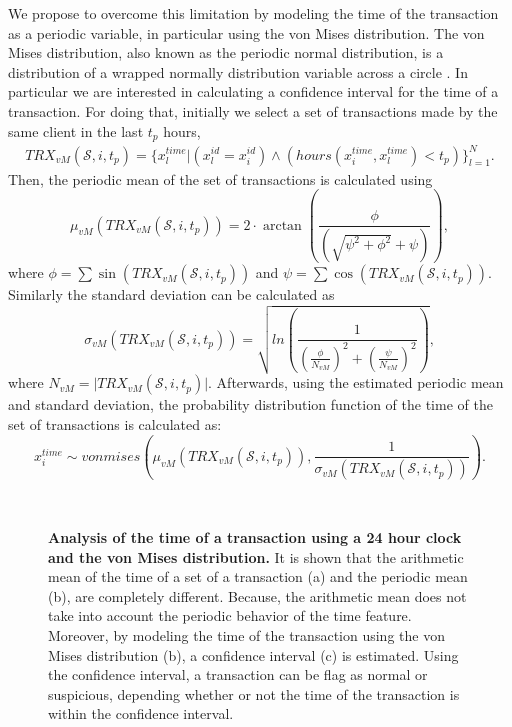 	We propose to overcome this limitation by modeling the time of the transaction as a periodic 
	variable, in particular using the von Mises distribution. The von Mises distribution, also known 
	as the periodic normal distribution, is a distribution of a wrapped normally distribution 
	variable across a circle \citep{Fisher1996}. In particular we are interested in calculating a 
	confidence interval 	for the time of a transaction. For doing that, initially we select a set of 
	transactions made by 	the same client in the last $t_p$ hours,
	\begin{align}\label{eq:pe_features1}
		TRX_{vM}(\mathcal{S},i, t_p) = \bigg\{ x_l^{time} \bigg\vert   
		\left(x_l^{id}=x_i^{id}\right)\wedge  \left(hours(x_i^{time},x_l^{time})< t_p\right) 
		\bigg\}_{l=1}^N.
	\end{align}
	Then, the periodic mean of the set 	of transactions is calculated using 
	\begin{equation}
		\mu_{vM}(TRX_{vM}(\mathcal{S},i, t_p)) = 2\cdot \arctan\left(\frac{\phi}{\left(
		\sqrt{\psi^2 + \phi^2} +	\psi \right)} \right),
	\end{equation}
	where $\phi=\sum \sin(TRX_{vM}(\mathcal{S},i, t_p))$ and $\psi=\sum \cos(TRX_{vM}(\mathcal{S},i, 
	t_p))$. Similarly the standard deviation can be calculated as
	\begin{equation}
		\sigma_{vM}(TRX_{vM}(\mathcal{S},i, t_p)) = \sqrt{ ln\left( \frac{1}{
		\left(\frac{\phi}{N_{vM}} \right)^2  + \left(\frac{\psi}{N_{vM}} \right)^2 } \right) },
	\end{equation}
	where $N_{vM}=\vert TRX_{vM}(\mathcal{S},i, t_p) \vert$.
	Afterwards, using the estimated periodic mean and standard deviation, the probability 
	distribution function of the time of the set of transactions is calculated as:
	\begin{equation}
	 x_i^{time} \sim vonmises\left(\mu_{vM}(TRX_{vM}(\mathcal{S},i, t_p)), 
	\frac{1}{\sigma_{vM}(TRX_{vM}(\mathcal{S},i, t_p))} \right).
	\end{equation}
	
	  \begin{figure}[!t]
		\centering
		\hfill
		\\
		\caption{\textbf{Analysis of the time of a transaction using a 24 hour clock and the von Mises 
		distribution.} It is shown that the arithmetic mean of the time of a set of a transaction (a) 
		and the 	periodic mean (b), are completely 	different. Because, the arithmetic mean does not 
		take 		into 	account the periodic behavior of the 	time feature. Moreover, 	by modeling the 
		time of the 		transaction using the von Mises 	distribution (b), a confidence 	interval (c) 
		is estimated. Using 		the confidence interval, a 	transaction can be flag as normal 	or	 
		suspicious, depending 		whether or 	not the time of the 	transaction is within the 	
		confidence 	interval.}
		\label{fig_sim2}
  \end{figure} 
	
